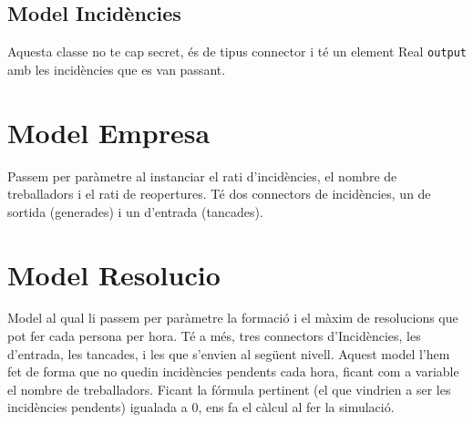 \documentclass[8pt]{beamer}
\begin{document}
\begin{frame}
\section{Model Incidències}


Aquesta classe no te cap secret, és de tipus connector i té un element Real \texttt{output} amb les incidències que es van passant.
\end{frame}
\section{Model Empresa}
\begin{frame}

Passem per paràmetre al instanciar el rati d'incidències, el nombre de treballadors i el rati de reopertures. Té dos connectors de incidències, un de sortida (generades) i un d'entrada (tancades).
\end{frame}
\section{Model Resolucio}
\begin{frame}


Model al qual li passem per paràmetre la formació i el màxim de resolucions que pot fer cada persona per hora. Té a més, tres connectors d'Incidències, les d'entrada, les tancades, i les que s'envien al següent nivell.
Aquest model l'hem fet de forma que no quedin incidències pendents cada hora, ficant com a variable el nombre de treballadors. 
Ficant la fórmula pertinent (el que vindrien a ser les incidències pendents) igualada a 0, ens fa el càlcul al fer la simulació.
\end{frame}
\end{document}
